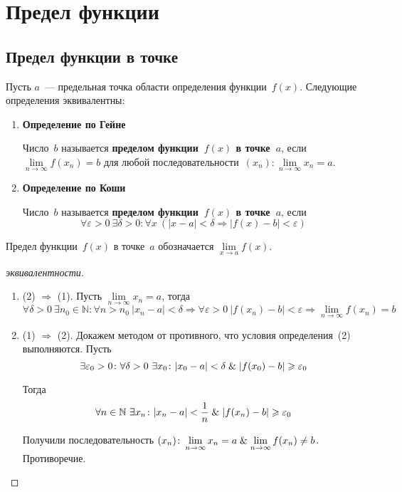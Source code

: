 \section{Предел функции}
\subsection{Предел функции в точке}
 

Пусть $a$~--- предельная точка области определения функции~$f(x)$.
Следующие определения эквивалентны:
\begin{enumerate}
	\item \textbf{Определение по Гейне}
	
	Число~$b$ называется \textbf{пределом функции~$f(x)$ в точке~$a$}, если $\lim\limits_{n \to \infty} f(x_n) = b$ для любой последовательности~$(x_n) \colon \lim\limits_{n \to \infty} x_n = a$.
	
	\item \textbf{Определение по Коши}
	
	Число~$b$ называется \textbf{пределом функции~$f(x)$ в точке~$a$}, если
	\begin{equation*}
	\forall \varepsilon > 0 \ \exists \delta > 0 \colon \forall x \ (|x - a| < \delta \Rightarrow |f(x) - b| < \varepsilon)
	\end{equation*}
\end{enumerate}

Предел функции~$f(x)$ в точке~$a$ обозначается $\lim\limits_{x \to a} f(x)$.
\begin{proof}[эквивалентности]
\begin{enumerate}
	\item (2) $\Rightarrow$ (1).
	Пусть $\lim\limits_{n \to \infty} x_n = a$, тогда
	\begin{equation*}
	\forall \delta > 0 \ \exists n_0 \in \mathbb N \colon \forall n > n_0 \ |x_n - a| < \delta \Rightarrow
	\forall \varepsilon > 0 \ |f(x_n) - b| < \varepsilon \Rightarrow
	\lim_{n \to \infty} f(x_n) = b
	\end{equation*}
	
	\item (1) $\Rightarrow$ (2).
	Докажем методом от противного, что условия определения~(2) выполняются.
	Пусть
	\begin{equation*}
	\exists \varepsilon_0 > 0 \colon \forall \delta > 0 \ \exists x_0 \colon |x_0 - a| < \delta \mathrel{\&} |f(x_0) - b| \geqslant \varepsilon_0
	\end{equation*}
	
	Тогда
	\begin{equation*}
	\forall n \in \mathbb N \ \exists x_n \colon |x_n - a| < \frac1n \mathrel{\&} |f(x_n) - b| \geqslant \varepsilon_0
	\end{equation*}
	
	Получили последовательность $(x_n) \colon \lim\limits_{n \to \infty} x_n = a \mathrel{\&} \lim\limits_{n \to \infty} f(x_n) \neq b$.
	Противоречие.
\end{enumerate}
\end{proof}

